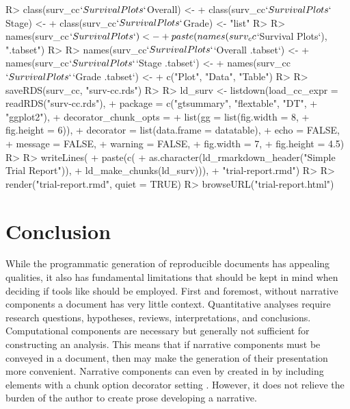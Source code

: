 \documentclass[
]{jss}
\begin{document}
\begin{CodeChunk}
\begin{CodeInput}
R> class(surv_cc$`Survival Plots`$Overall) <- 
+   class(surv_cc$`Survival Plots`$Stage) <-
+   class(surv_cc$`Survival Plots`$Grade) <- "list"
R> 
R> names(surv_cc$`Survival Plots`) <- 
+   paste(names(surv_cc$`Survival Plots`), "{.tabset}")
R> 
R> names(surv_cc$`Survival Plots`$`Overall {.tabset}`) <- 
+   names(surv_cc$`Survival Plots`$`Stage {.tabset}`) <- 
+   names(surv_cc$`Survival Plots`$`Grade {.tabset}`) <- 
+   c("Plot", "Data", "Table")
R>   
R> saveRDS(surv_cc, "surv-cc.rds")
R> 
R> ld_surv <- listdown(load_cc_expr = readRDS("surv-cc.rds"),
+                     package = c("gtsummary", "flextable", "DT", 
+                                 "ggplot2"),
+                     decorator_chunk_opts = 
+                       list(gg = list(fig.width = 8,
+                                      fig.height = 6)),
+                     decorator = list(data.frame = datatable),
+                     echo = FALSE,
+                     message = FALSE,
+                     warning = FALSE,
+                     fig.width = 7,
+                     fig.height = 4.5)
R> 
R> writeLines(
+   paste(c(
+     as.character(ld_rmarkdown_header("Simple Trial Report")),
+     ld_make_chunks(ld_surv))),
+   "trial-report.rmd")
R> 
R> render("trial-report.rmd", quiet = TRUE)
R> browseURL("trial-report.html")
\end{CodeInput}
\end{CodeChunk}

\hypertarget{conclusion}{%
\section{Conclusion}\label{conclusion}}

While the programmatic generation of reproducible documents has
appealing qualities, it also has fundamental limitations that should be
kept in mind when deciding if tools like  should be
employed. First and foremost, without narrative components a document
has very little context. Quantitative analyses require research
questions, hypotheses, reviews, interpretations, and conclusions.
Computational components are necessary but generally not sufficient for
constructing an analysis. This means that if narrative components must
be conveyed in a document, then  may make the generation
of their presentation more convenient. Narrative components can even by
created in  by including  elements with a
chunk option decorator setting . However, it
does not relieve the burden of the author to create prose developing a
narrative.
\end{document}
